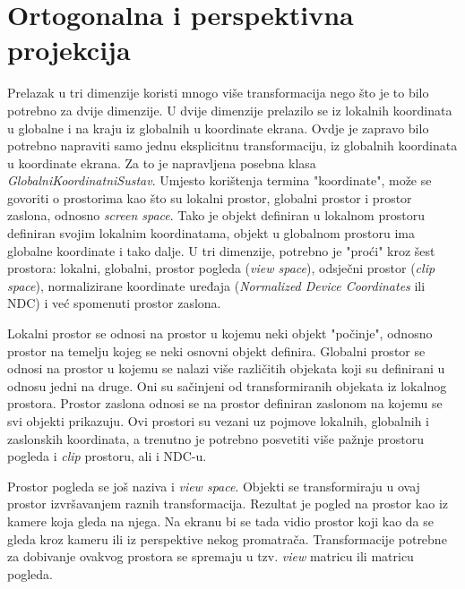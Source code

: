 \documentclass{foi}
\begin{document}
\section{Ortogonalna i perspektivna projekcija}
Prelazak u tri dimenzije koristi mnogo više transformacija nego što je to bilo potrebno za dvije dimenzije. U dvije dimenzije prelazilo se iz lokalnih koordinata u globalne i na kraju iz globalnih u koordinate ekrana. Ovdje je zapravo bilo potrebno napraviti samo jednu eksplicitnu transformaciju, iz globalnih koordinata u koordinate ekrana. Za to je napravljena posebna klasa \textit{GlobalniKoordinatniSustav}. Umjesto korištenja termina "koordinate", može se govoriti o prostorima kao što su lokalni prostor, globalni prostor i prostor zaslona, odnosno \textit{screen space}. Tako je objekt definiran u lokalnom prostoru definiran svojim lokalnim koordinatama, objekt u globalnom prostoru ima globalne koordinate i tako dalje. U tri dimenzije, potrebno je "proći" kroz šest prostora: lokalni, globalni, prostor pogleda (\textit{view space}), odsječni prostor (\textit{clip space}), normalizirane koordinate uređaja (\textit{Normalized Device Coordinates} ili NDC) i već spomenuti prostor zaslona.

Lokalni prostor se odnosi na prostor u kojemu neki objekt "počinje", odnosno prostor na temelju kojeg se neki osnovni objekt definira. Globalni prostor se odnosi na prostor u kojemu se nalazi više različitih objekata koji su definirani u odnosu jedni na druge. Oni su sačinjeni od transformiranih objekata iz lokalnog prostora. Prostor zaslona odnosi se na prostor definiran zaslonom na kojemu se svi objekti prikazuju. Ovi prostori su vezani uz pojmove lokalnih, globalnih i zaslonskih koordinata, a trenutno je potrebno posvetiti više pažnje prostoru pogleda i \textit{clip} prostoru, ali i NDC-u.  

Prostor pogleda se još naziva i \textit{view space}. Objekti se transformiraju u ovaj prostor izvršavanjem raznih transformacija. Rezultat je pogled na prostor kao iz kamere koja gleda na njega. Na ekranu bi se tada vidio prostor koji kao da se gleda kroz kameru ili iz perspektive nekog promatrača. Transformacije potrebne za dobivanje ovakvog prostora se spremaju u tzv. \textit{view} matricu ili matricu pogleda. 
\end{document}
